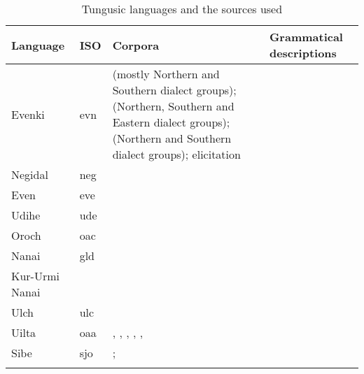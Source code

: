 \documentclass[output=paper,colorlinks,citecolor=brown
\ChapterDOI{10.5281/zenodo.15697577}
]{langscibook}
\begin{document}
\begin{table}
\begin{tabularx}{\textwidth}{ll>{\raggedright}p{50mm}Q}
 \lsptoprule
 Language & ISO & Corpora & Grammatical descriptions\\
 \midrule
 Evenki & evn & \cite{EvenkiCorpusSiberianLang} (mostly Northern and Southern dialect groups);
		\cite{EvenkiCorpusIEA} (Northern, Southern and Eastern dialect groups);
		\cite{EvenkiCorpusINEL} (Northern and Southern dialect groups); elicitation & \citet{klyachko2022}\\
\tablevspace
 Negidal & neg & \cite{NegidalCorpus} & \citet{khasanova2003}\\
\tablevspace
 Even & eve & \citet{nikolaevagarret} & \citet{matic2008} \\
\tablevspace
 Udihe & ude & \citet{nikolaevagarret} & \citet{Shneider1936}\newline
					\citet{Shneider1937}\newline
					\citet{nikolaeva2001grammar}\newline
					\citet{tolskaya2008question}\\
\tablevspace
 Oroch & oac & \citet{kazama1996} & \\
\tablevspace
 Nanai & gld & \citet{beldy2012} & \citet{kazama2007rhetorical}\newline
				    \citet{kazama1993}\\
\tablevspace
Kur-Urmi  Nanai&  & \cite{nanaicorpus} & \\
\tablevspace
 Ulch & ulc & \cite{ulchcorpus} & \citet{petrova1936}\\
\tablevspace
 Uilta & oaa & \citet{ikegami2010}, \citet{yamada2011uiruta}, \citet{yamada2015}, \citet{yamada2017}, \cite{uiltacorpus}, \cite{minlang_uilta} &\\
\tablevspace
 Sibe & sjo & \citet{kogura2021sibe}; \citet{kogura2022} & \citet{zikmundova2013spoken}
 \\
 \lspbottomrule
\end{tabularx}
 \caption{Tungusic languages and the sources used\label{tab:klyachko:data}}
\end{table}
\end{document}
